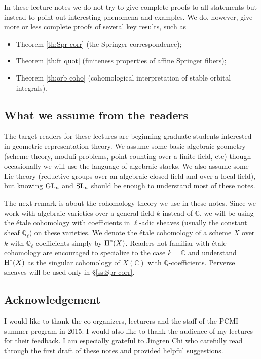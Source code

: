 \documentclass[]{pcmi}
\theoremstyle{plain}
\theoremstyle{definition}
\def\CC{\mathbb{C}}
\def\QQ{\mathbb{Q}}
\newcommand\GL{\textup{GL}}
\newcommand\SL{\textup{SL}}
\newcommand{\Ql}{\QQ_{\ell}}
\newcommand{\cohog}[2]{\textup{H}^{#1}({#2})}     %
\begin{document}
In these lecture notes we do not try to give complete proofs to all statements but instead to point out interesting phenomena and examples. We do, however, give more or less complete proofs of several key results, such as 
\begin{itemize}
\item Theorem \ref{th:Spr corr} (the Springer correspondence);
\item Theorem \ref{th:ft quot} (finiteness properties of affine Springer fibers);
\item Theorem \ref{th:orb coho} (cohomological interpretation of stable orbital integrals).
\end{itemize}


\subsection{What we assume from the readers} The target readers for these lectures are beginning graduate students interested in geometric representation theory. We assume some basic algebraic geometry (scheme theory, moduli problems, point counting over a finite field, etc) though occasionally we will use the language of algebraic stacks. We also assume some Lie theory (reductive groups over an algebraic closed field and over a local field), but knowing $\GL_{n}$ and $\SL_{n}$ should be enough to understand most of these notes. 

The next remark is about the cohomology theory we use in these notes. Since we work with algebraic varieties over a general field $k$ instead of $\CC$, we will be using the \'etale cohomology with coefficients in $\ell$-adic sheaves (usually the constant sheaf $\Ql$) on these varieties. We denote the \'etale cohomology of a scheme $X$ over $k$ with $\Ql$-coefficients simply by $\cohog{*}{X}$. Readers not familiar with \'etale cohomology are encouraged to specialize to the case $k=\CC$ and understand $\cohog{*}{X}$ as the singular cohomology of $X(\CC)$ with $\QQ$-coefficients. Perverse sheaves will be used only in \S\ref{ss:Spr corr}.


\subsection*{Acknowledgement} I would like to thank the co-organizers, lecturers and the staff of the PCMI summer program in 2015. I would also like to thank the audience of my lectures for their feedback. I am especially grateful to Jingren Chi who carefully read through the first draft of these notes and provided helpful suggestions.
\end{document}
